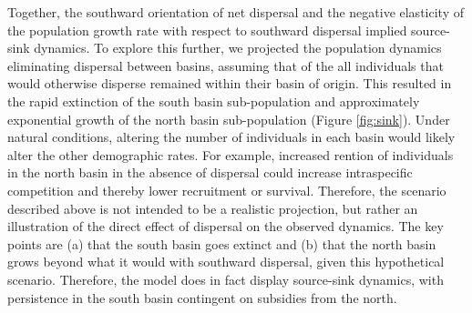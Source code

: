 Together, the southward orientation of net dispersal and the negative elasticity 
of the population growth rate with respect to southward dispersal implied source-sink dynamics. 
To explore this further, 
we projected the population dynamics eliminating dispersal between basins, 
assuming that of the all individuals that would otherwise disperse remained within
their basin of origin.
This resulted in the rapid extinction of the south basin sub-population
and approximately exponential growth 
of the north basin sub-population (Figure \ref{fig:sink}).
Under natural conditions, 
altering the number of individuals in each basin 
would likely alter the other demographic rates.
For example, increased rention of individuals in the north basin in the absence of dispersal
could increase intraspecific competition and thereby lower recruitment or survival.
Therefore, the scenario described above is not intended to be a realistic projection, 
but rather an illustration of the direct effect of dispersal on the observed dynamics.
The key points are 
(a) that the south basin goes extinct and 
(b) that the north basin grows beyond what it would with southward dispersal,
given this hypothetical scenario.
Therefore, the model does in fact display source-sink dynamics,
with persistence in the south basin contingent on subsidies from the north.








